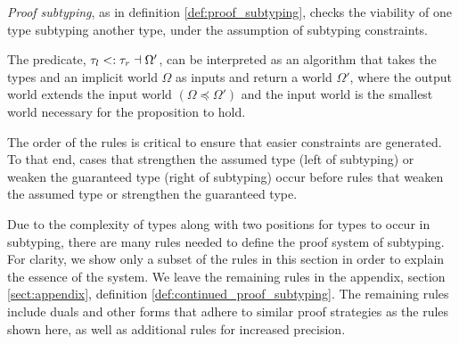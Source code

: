 \documentclass[acmsmall]{acmart}
\theoremstyle{definition}
\begin{document}










\emph{Proof subtyping}, as in definition \ref{def:proof_subtyping},
checks the viability of one type subtyping another type, under the assumption
of subtyping constraints.

The predicate, $\tau_l <: \tau_r \dashv \Omega'$, can be interpreted as an algorithm
that takes the types and an implicit world $\Omega$ as inputs and return
a world $\Omega'$, where the output world extends the input world $(\Omega \preceq \Omega')$
and the input world is the smallest world necessary for the proposition to hold.  


The order of the rules 
is critical to ensure that easier constraints are generated. To that end, cases that
strengthen the assumed type (left of subtyping) or weaken the guaranteed type (right of subtyping) occur before rules that
weaken the assumed type or strengthen the guaranteed type.

Due to the complexity of types along with two positions for types to occur in subtyping,
there are many rules needed to define the proof system of subtyping. For clarity,
we show only a subset of the rules in this section in order to explain the essence of the system.
We leave the remaining rules in the appendix, section \ref{sect:appendix}, definition \ref{def:continued_proof_subtyping}. 
The remaining rules include duals and other forms that adhere to similar proof strategies as the rules shown here,
as well as additional rules for increased precision.  
\end{document}
